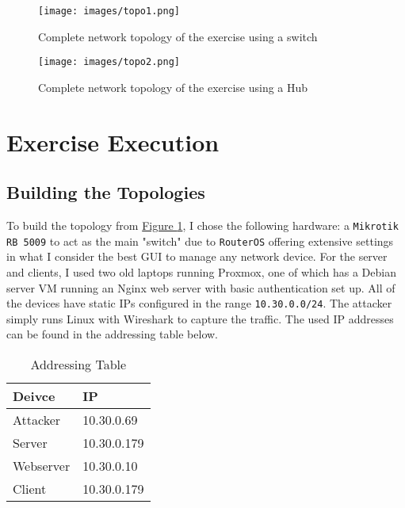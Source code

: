 \documentclass[a4paper]{article}
\newcommand{\abc}{\hfill \break}
\begin{document}
\begin{figure}[ht]
	\texttt{[image: images/topo1.png]}
	\centering
	\caption{Complete network topology of the exercise using a switch}
	\label{fig:topo1}
\end{figure}
\begin{figure}[!htbp]
	\texttt{[image: images/topo2.png]}
	\centering
	\caption{Complete network topology of the exercise using a Hub}
	\label{fig:topo2}
\end{figure}

\newpage

\section{Exercise Execution}

\subsection{Building the Topologies}

To build the topology from \textcolor{blue}{\hyperref[fig:nwconf]{Figure \ref{fig:topo1}}}, I chose the following hardware: a \texttt{Mikrotik RB 5009} to act as the main "switch" due to \texttt{RouterOS} offering extensive settings in what I consider the best GUI to manage any network device.\abc
For the server and clients, I used two old laptops running Proxmox, one of which has a Debian server VM running an Nginx web server with basic authentication set up. All of the devices have static IPs configured in the range \texttt{10.30.0.0/24}. The attacker simply runs Linux with Wireshark to capture the traffic. The used IP addresses can be found in the addressing table below.

\begin{table}[h]
\centering
\begin{tabular}{|l|l}
\hline
\textbf{Deivce}    & \multicolumn{1}{l|}{\textbf{IP}}          \\ \hline
Attacker  & \multicolumn{1}{l|}{10.30.0.69}  \\ \hline
Server    & \multicolumn{1}{l|}{10.30.0.179} \\ \hline
Webserver & \multicolumn{1}{l|}{10.30.0.10}  \\ \hline
Client    & \multicolumn{1}{l|}{10.30.0.179} \\ \hline
\end{tabular}
\caption{Addressing Table}
\label{tab:addressing-table}
\end{table}
\end{document}
